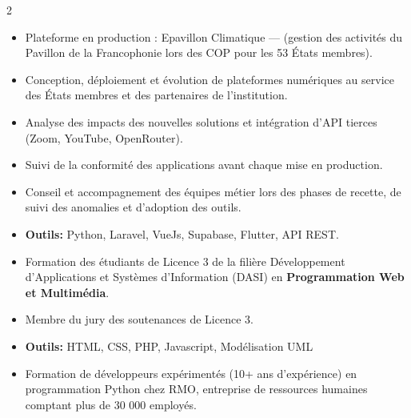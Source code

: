 \documentclass[10pt,a4paper,ragged2e,withhyper]{altacv}
\begin{document}
\begin{paracol}{2}
            \begin{itemize}
                \item Plateforme en production : Epavillon Climatique —  (gestion des activités du Pavillon de la Francophonie lors des COP pour les 53 États membres).
                \item Conception, déploiement et évolution de plateformes numériques au service des États membres et des partenaires de l'institution.
                \item Analyse des impacts des nouvelles solutions et intégration d'API tierces (Zoom, YouTube, OpenRouter).
                \item Suivi de la conformité des applications avant chaque mise en production.
                \item Conseil et accompagnement des équipes métier lors des phases de recette, de suivi des anomalies et d'adoption des outils.
                \item \textcolor{SecondaryColor}{\textbf{Outils: }} Python, Laravel, VueJs, Supabase, Flutter, API REST.
            \end{itemize}
            \divider

            \newpage

            \begin{itemize}
                \item Formation des étudiants de Licence 3 de la filière Développement d'Applications et Systèmes d'Information (DASI) en {\textbf{Programmation Web et Multimédia}}.
                \item Membre du jury des soutenances de Licence 3.
                \item \textcolor{SecondaryColor}{\textbf{Outils: }} HTML, CSS, PHP, Javascript, Modélisation UML
            \end{itemize}
            \divider

            \begin{itemize}
                \item Formation de développeurs expérimentés (10+ ans d'expérience) en programmation Python chez RMO, entreprise de ressources humaines comptant plus de 30 000 employés.
            \end{itemize}
            \divider


\end{paracol}
\end{document}
